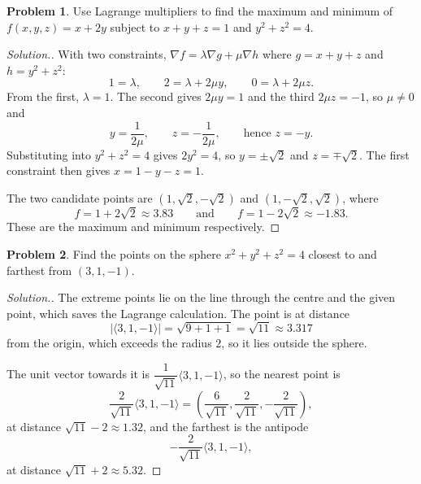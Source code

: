 \documentclass[11pt,a4paper]{article}
\theoremstyle{definition}
\newtheorem{problemx}{Problem}[subsection]
\newenvironment{problem}{\begin{problemx}}{\end{problemx}}
\newenvironment{solution}
  {\renewcommand{\qedsymbol}{}\begin{proof}[\textit{Solution}.]}
  {\end{proof}}
\begin{document}
\begin{problem}
Use Lagrange multipliers to find the maximum and minimum of $f(x,y,z) = x+2y$
subject to $x+y+z = 1$ and $y^2+z^2 = 4$.
\end{problem}
\begin{solution}
With two constraints, $\nabla f = \lambda\nabla g + \mu\nabla h$ where
$g = x+y+z$ and $h = y^2+z^2$:
\[1 = \lambda,\qquad 2 = \lambda + 2\mu y,\qquad 0 = \lambda + 2\mu z .\]
From the first, $\lambda = 1$. The second gives $2\mu y = 1$ and the third
$2\mu z = -1$, so $\mu\neq 0$ and
\[y = \frac{1}{2\mu},\qquad z = -\frac{1}{2\mu},\qquad\text{hence } z = -y .\]
Substituting into $y^2+z^2 = 4$ gives $2y^2 = 4$, so
$y = \pm\sqrt2$ and $z = \mp\sqrt2$. The first constraint then gives
$x = 1-y-z = 1$.

The two candidate points are $(1, \sqrt2, -\sqrt2)$ and
$(1, -\sqrt2, \sqrt2)$, where
\[f = 1+2\sqrt2 \approx 3.83 \qquad\text{and}\qquad f = 1-2\sqrt2\approx -1.83 .\]
These are the maximum and minimum respectively.
\end{solution}

\begin{problem}
Find the points on the sphere $x^2+y^2+z^2 = 4$ closest to and farthest from
$(3,1,-1)$.
\end{problem}
\begin{solution}
The extreme points lie on the line through the centre and the given point, which
saves the Lagrange calculation. The point is at distance
\[\left|\langle 3,1,-1\rangle\right| = \sqrt{9+1+1} = \sqrt{11}\approx 3.317\]
from the origin, which exceeds the radius $2$, so it lies outside the sphere.

The unit vector towards it is $\dfrac{1}{\sqrt{11}}\langle 3,1,-1\rangle$, so
the nearest point is
\[\frac{2}{\sqrt{11}}\langle 3,1,-1\rangle
= \left(\frac{6}{\sqrt{11}}, \frac{2}{\sqrt{11}}, -\frac{2}{\sqrt{11}}\right),\]
at distance $\sqrt{11}-2\approx 1.32$, and the farthest is the antipode
\[-\frac{2}{\sqrt{11}}\langle 3,1,-1\rangle ,\]
at distance $\sqrt{11}+2\approx 5.32$.
\end{solution}
\end{document}
